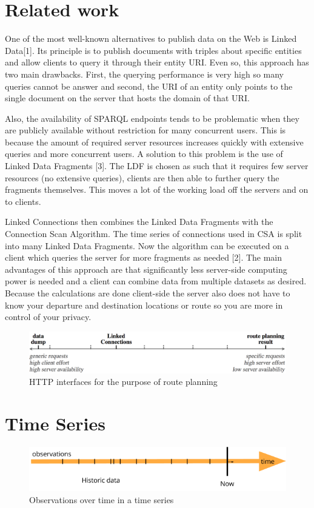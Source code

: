 \documentclass[runningheads,a4paper]{llncs}
\makeatletter
\def\maxwidth#1{\ifdim\Gin@nat@width>#1 #1\else\Gin@nat@width\fi}
\makeatother
\begin{document}
\section{Related work}

One of the most well-known alternatives to publish data on the Web is Linked Data[1]. Its principle is to publish documents with triples about specific entities and allow clients to query it through their entity URI. Even so, this approach has two main drawbacks. First, the querying performance is very high so many queries cannot be answer and second, the URI of an entity only points to the single document on the server that hosts the domain of that URI.

Also, the availability of SPARQL endpoints tends to be problematic when they are publicly available without restriction for many concurrent users. This is because the amount of required server resources increases quickly with extensive queries and more concurrent users. A solution to this problem is the use of Linked Data Fragments [3]. The LDF is chosen as such that it requires few server resources (no extensive queries), clients are then able to further query the fragments themselves. This moves a lot of the working load off the servers and on to clients.

Linked Connections then combines the Linked Data Fragments with the Connection Scan Algorithm. The time series of connections used in CSA is split into many Linked Data Fragments. Now the algorithm can be executed on a client which queries the server for more fragments as needed [2]. The main advantages of this approach are that significantly less server-side computing power is needed and a client can combine data from multiple datasets as desired. Because the calculations are done client-side the server also does not have to know your departure and destination locations or route so you are more in control of your privacy.
\begin{figure}[h!]
\centering
\includegraphics[width=\maxwidth{\textwidth}]{./img/image1.png}
\cprotect\caption{HTTP  interfaces  for the  purpose  of  route  planning}
\label{}
\end{figure}


\section{Time Series}
\begin{figure}[h!]
\centering
\includegraphics[width=\maxwidth{\textwidth}]{./img/image2.png}
\cprotect\caption{Observations  over time in a time  series}
\label{}
\end{figure}
\end{document}
